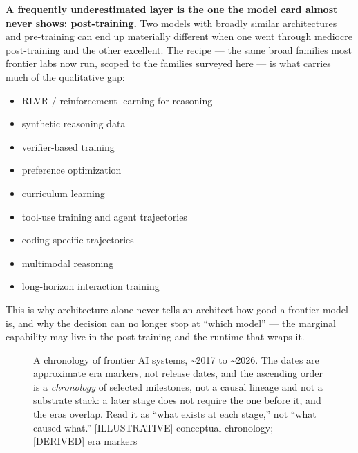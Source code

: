 \textbf{A frequently underestimated layer is the one the model card
almost never shows: post-training.} Two models with broadly similar
architectures and pre-training can end up materially different when one
went through mediocre post-training and the other excellent. The recipe
--- the same broad families most frontier labs now run, scoped to the
families surveyed here --- is what carries much of the qualitative gap:

\begin{itemize}
\tightlist
\item
  RLVR / reinforcement learning for reasoning
\item
  synthetic reasoning data
\item
  verifier-based training
\item
  preference optimization
\item
  curriculum learning
\item
  tool-use training and agent trajectories
\item
  coding-specific trajectories
\item
  multimodal reasoning
\item
  long-horizon interaction training
\end{itemize}

This is why architecture alone never tells an architect how good a
frontier model is, and why the decision can no longer stop at ``which
model'' --- the marginal capability may live in the post-training and
the runtime that wraps it.

\begin{figure}
\centering
{}
\caption[A chronology of frontier AI systems, \textasciitilde2017 to \textasciitilde2026]{A chronology of frontier AI systems, \textasciitilde2017 to \textasciitilde2026. The dates are approximate era markers, not release dates, and the ascending order is a \emph{chronology} of selected milestones, not a causal lineage and not a substrate stack: a later stage does not require the one before it, and the eras overlap. Read it as ``what exists at each stage,'' not ``what caused what.'' \mbox{{[}ILLUSTRATIVE{]}} conceptual chronology; \mbox{{[}DERIVED{]}} era markers}
\end{figure}

